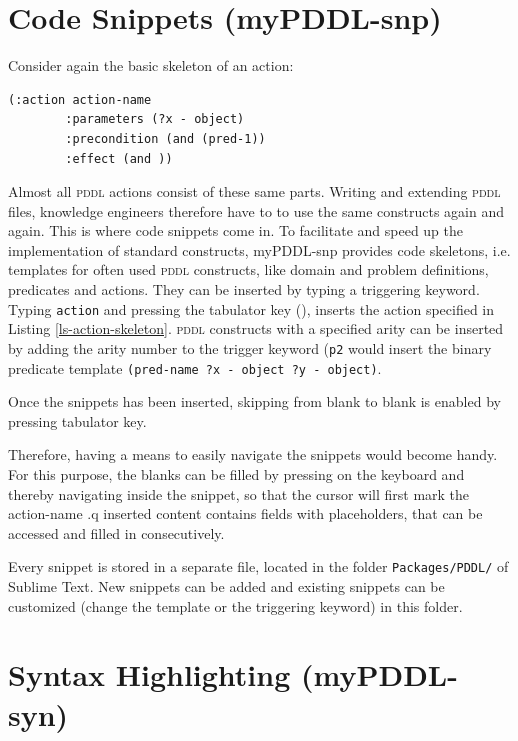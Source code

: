 \documentclass[a4paper,12pt]{report}
\newcommand{\mypddl}{\smallerft[0.8]{myPDDL}\xspace}
\newcommand{\pddl}{\textsc{pddl}\xspace}
\newcommand\smallerft[2][0.85]{{\scalefont{#1}#2}}
\begin{document}
\section{Code Snippets (myPDDL-snp)}
\label{sec-4-2}

Consider again the basic skeleton of an action:

\begin{listing}[H]
\begin{verbatim}
(:action action-name
        :parameters (?x - object)
        :precondition (and (pred-1))
        :effect (and ))
\end{verbatim}
\caption{\label{ls-action-skeleton}Skeleton of an \pddl action}
\end{listing}

Almost all \pddl actions consist of these same parts. Writing and
extending \pddl files, knowledge engineers therefore have to to use
the same constructs again and again. This is where code snippets come
in. To facilitate and speed up the implementation of standard
constructs, \mypddl-snp provides code skeletons, i.e. templates for
often used \pddl constructs, like domain and problem definitions,
predicates and actions. They can be inserted by typing a triggering
keyword. Typing \texttt{action} and pressing the tabulator key (\keys{\tab}),
inserts the action specified in Listing \ref{ls-action-skeleton}. \pddl
constructs with a specified arity can be inserted by adding the arity
number to the trigger keyword (\texttt{p2} would insert the binary predicate
template \texttt{(pred-name ?x - object ?y - object)}.

Once the snippets has been inserted, skipping from blank to blank is
enabled by pressing tabulator key.

Therefore, having a means to easily navigate the snippets
would become handy. For this purpose, the blanks can be filled by
pressing \tab on the keyboard and thereby navigating inside the
snippet, so that the cursor will first mark the action-name .q
inserted content contains fields with placeholders, that can be
accessed and filled in consecutively.

Every snippet is stored in a separate file, located in the folder
\texttt{Packages/PDDL/} of Sublime Text. New snippets can be added and
existing snippets can be customized (change the template or the
triggering keyword) in this folder.
\section{Syntax Highlighting (myPDDL-syn)}
\label{sec-4-3}
\label{sec:syntax}
\end{document}
